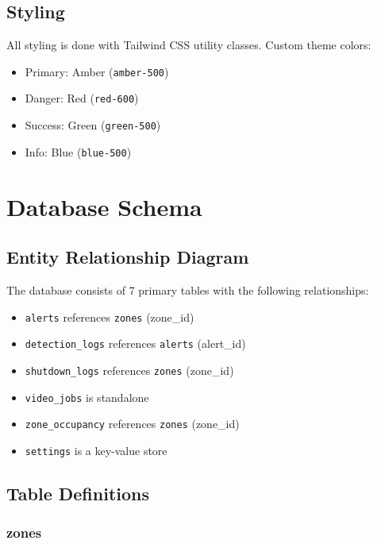 \documentclass[12pt,a4paper,oneside]{book}
\begin{document}
\section{Styling}

All styling is done with Tailwind CSS utility classes. Custom theme colors:
\begin{itemize}
    \item Primary: Amber (\texttt{amber-500})
    \item Danger: Red (\texttt{red-600})
    \item Success: Green (\texttt{green-500})
    \item Info: Blue (\texttt{blue-500})
\end{itemize}

\chapter{Database Schema}

\section{Entity Relationship Diagram}

The database consists of 7 primary tables with the following relationships:

\begin{itemize}
    \item \texttt{alerts} references \texttt{zones} (zone\_id)
    \item \texttt{detection\_logs} references \texttt{alerts} (alert\_id)
    \item \texttt{shutdown\_logs} references \texttt{zones} (zone\_id)
    \item \texttt{video\_jobs} is standalone
    \item \texttt{zone\_occupancy} references \texttt{zones} (zone\_id)
    \item \texttt{settings} is a key-value store
\end{itemize}

\section{Table Definitions}

\subsection{zones}
\end{document}
